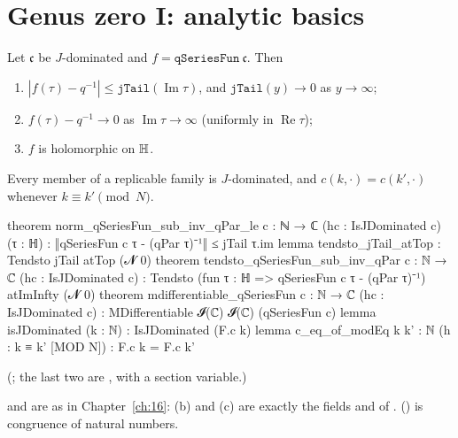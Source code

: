 \section{Genus zero I: analytic basics}\label{ch19:sec:analytic}

\begin{theorem}\label{ch19:thm:analytic}
Let $\mathfrak c$ be $J$-dominated and $f=\mathtt{qSeriesFun}\ \mathfrak c$.  Then
\begin{enumerate}[label=(\alph*)]
\item $|f(\tau)-q^{-1}|\le\mathtt{jTail}(\operatorname{Im}\tau)$, and $\mathtt{jTail}(y)\to0$ as $y\to\infty$;
\item $f(\tau)-q^{-1}\to0$ as $\operatorname{Im}\tau\to\infty$ (uniformly in $\operatorname{Re}\tau$);
\item $f$ is holomorphic on $\mathbb{H}$.
\end{enumerate}
Every member of a replicable family is $J$-dominated, and $c(k,\cdot)=c(k',\cdot)$ whenever $k\equiv k'\pmod N$.
\end{theorem}
\begin{leancode}
theorem norm_qSeriesFun_sub_inv_qPar_le {c : ℕ → ℂ} (hc : IsJDominated c) (τ : ℍ) :
    ‖qSeriesFun c τ - (qPar τ)⁻¹‖ ≤ jTail τ.im
lemma tendsto_jTail_atTop : Tendsto jTail atTop (𝓝 0)
theorem tendsto_qSeriesFun_sub_inv_qPar {c : ℕ → ℂ} (hc : IsJDominated c) :
    Tendsto (fun τ : ℍ => qSeriesFun c τ - (qPar τ)⁻¹) atImInfty (𝓝 0)
theorem mdifferentiable_qSeriesFun {c : ℕ → ℂ} (hc : IsJDominated c) :
    MDifferentiable 𝓘(ℂ) 𝓘(ℂ) (qSeriesFun c)
lemma isJDominated (k : ℕ) : IsJDominated (F.c k)
lemma c_eq_of_modEq {k k' : ℕ} (h : k ≡ k' [MOD N]) : F.c k = F.c k'
\end{leancode}
(; the last two are ,
 with  a section variable.)
\begin{dictionary}
 and  are as in Chapter~\ref{ch:16}: (b) and (c) are exactly the fields
 and  of .   () is
congruence of natural numbers.
\end{dictionary}
